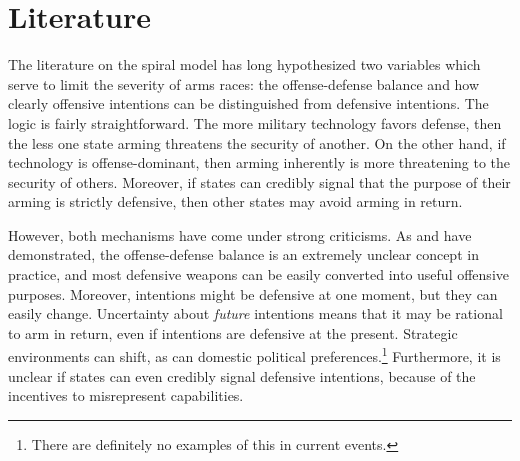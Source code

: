 \documentclass[12pt]{article}
\begin{document}

\section{Literature}\label{literature}
The literature on the spiral model has long hypothesized two variables which serve to limit the severity of arms races: the offense-defense balance and how clearly offensive intentions can be distinguished from defensive intentions. The logic is fairly straightforward. The more military technology favors defense, then the less one state arming threatens the security of another. On the other hand, if technology is offense-dominant, then arming inherently is more threatening to the security of others. Moreover, if states can credibly signal that the purpose of their arming is strictly defensive, then other states may avoid arming in return.

However, both mechanisms have come under strong criticisms. As \citet{biddle2001} and \citet{glaser1998} have demonstrated, the offense-defense balance is an extremely unclear concept in practice, and most defensive weapons can be easily converted into useful offensive purposes. Moreover, intentions might be defensive at one moment, but they can easily change. \citep{copeland2000} Uncertainty about \textit{future} intentions means that it may be rational to arm in return, even if intentions are defensive at the present. Strategic environments can shift, as can domestic political preferences.\footnote{There are definitely no examples of this in current events.} Furthermore, it is unclear if states can even credibly signal defensive intentions, because of the incentives to misrepresent capabilities. \citep{fearon1995}
\end{document}
